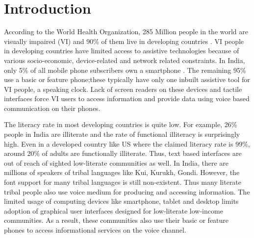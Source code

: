 \documentclass{sigchi}
\begin{document}
\section{Introduction}
According to the World Health Organization, 285 Million people in the world are visually impaired (VI) and 90\% of them live in developing countries \cite{WHO2013}. VI people in developing countries have limited access to assistive technologies because of various socio-economic, device-related and network related constraints. In India, only
5\% of all mobile phone subscribers own a smartphone \cite{Mary2013}. The remaining 95\% use a basic or feature phone;these typically have only one inbuilt assistive tool for VI people, a speaking clock. Lack of screen readers on these devices and tactile interfaces force VI users to access information and provide data using voice based communication on their phones. 

The literacy rate in most developing countries is quite low. For example, 26\% people in India are illiterate and the rate of functional illiteracy is surprisingly high. Even in a developed country like US where the claimed literacy rate is 99\%, around 20\% of adults are functionally illiterate. Thus, text based interfaces are out of reach of sighted low-literate communities as well. In India, there are millions of speakers of tribal languages like Kui, Kurukh, Gondi. However, the font support for many tribal languages is still non-existent. Thus many literate tribal people also use voice medium for producing and accessing information. The limited usage of computing devices like smartphone, tablet and desktop limits adoption of graphical user interfaces designed for low-literate low-income communities. As a result, these communities also use their basic or feature phones to access informational services on the voice channel.
\end{document}
